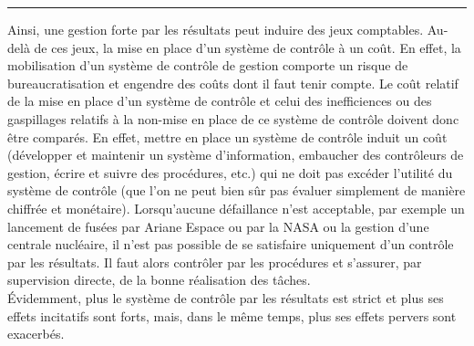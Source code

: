 \documentclass{tufte-handout}
\begin{document}
\begin{enumerate}
\noindent\rule{\textwidth}{0.5pt}

Ainsi, une gestion forte par les résultats peut induire des jeux comptables. Au-delà de ces jeux, la mise en place d’un système de contrôle à un coût. En effet, la mobilisation d’un système de contrôle de gestion comporte un risque de bureaucratisation et engendre des coûts dont il faut tenir compte. Le coût relatif de la mise en place d’un système de contrôle et celui des inefficiences ou des gaspillages relatifs à la non-mise en place de ce système de contrôle doivent donc être comparés. En effet, mettre en place un système de contrôle induit un coût (développer et maintenir un système d’information, embaucher des contrôleurs de gestion, écrire et suivre des procédures, etc.) qui ne doit pas excéder l’utilité du système de contrôle (que l’on ne peut bien sûr pas évaluer simplement de manière chiffrée et monétaire). Lorsqu’aucune défaillance n’est acceptable, par exemple un lancement de fusées par Ariane Espace ou par la NASA ou la gestion d’une centrale nucléaire, il n’est pas possible de se satisfaire uniquement d’un contrôle par les résultats. Il faut alors contrôler par les procédures et s’assurer, par supervision directe, de la bonne réalisation des tâches.\\

Évidemment, plus le système de contrôle par les résultats est strict et plus ses effets incitatifs sont forts, mais, dans le même temps, plus ses effets pervers sont exacerbés.\\
\end{enumerate}
\end{document}
